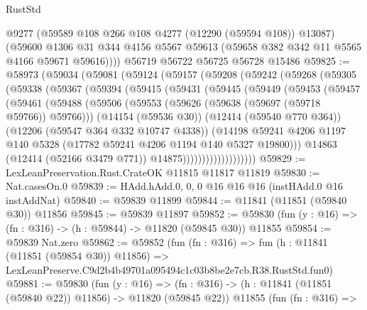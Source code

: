 \begin{lexlean}{RustStd}
\begin{coremodule}
        @9277
        (@59589 @108 @266 @108 @4277 (@12290 (@59594 @108)) @13087)
        (@59600
          @1306
          @31
          @344
          @4156
          @5567
          @59613
          (@59658 @382 @342 @11 @5565 @4166 @59671 @59616))))
    @56719
    @56722
    @56725
    @56728
    @15486
@59825 := @58973
    (@59034
      (@59081
        (@59124
          (@59157
            (@59208
              (@59242
                (@59268
                  (@59305
                    (@59338
                      (@59367
                        (@59394
                          (@59415
                            (@59431
                              (@59445
                                (@59449
                                  (@59453
                                    (@59457
                                      (@59461
                                        (@59488
                                          (@59506
                                            (@59553
                                              (@59626 (@59638 (@59697 (@59718 @59766)) @59766)))
                                            (@14154 (@59536 @30))
                                            (@12414 (@59540 @770 @364))
                                            (@12206 (@59547 @364 @332 @10747 @4338))
                                            (@14198
                                              @59241
                                              @4206
                                              @1197
                                              @140
                                              @5328
                                              (@17782 @59241 @4206 @1194 @140 @5327 @19800)))
                                          @14863
                                          (@12414 (@52166 @3479 @771))
                                          @14875)))))))))))))))))))
@59829 := LexLeanPreservation.Rust.CrateOK @11815 @11817 @11819
@59830 := Nat.casesOn.{0}
@59839 := HAdd.hAdd.{0, 0, 0} @16 @16 @16 (instHAdd.{0} @16 instAddNat)
@59840 := @59839 @11899
@59844 := @11841 (@11851 (@59840 @30)) @11856
@59845 := @59839 @11897
@59852 := @59830 (fun (y : @16) => (fn : @316) -> (h : @59844) -> @11820 (@59845 @30)) @11855
@59854 := @59839 Nat.zero
@59862 := @59852
    (fun (fn : @316) =>
    fun (h : @11841 (@11851 (@59854 @30)) @11856) =>
    LexLeanPreserve.C9d2b4b49701a095494c1c03b8be2e7cb.R38.RustStd.fun0)
@59881 := @59830
    (fun (y : @16) =>
    (fn : @316) -> (h : @11841 (@11851 (@59840 @22)) @11856) -> @11820 (@59845 @22))
    @11855
    (fun (fn : @316) =>

\end{coremodule}
\end{lexlean}
